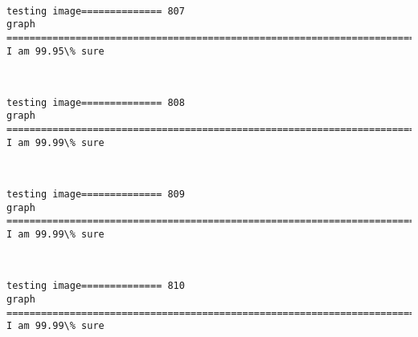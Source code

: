 \documentclass[11pt]{article}
\begin{document}
    \begin{center}
    \end{center}
    { \hspace*{\fill} \\}
    
    \begin{Verbatim}[commandchars=\\\{\}]
testing image============== 807
graph
============================================================================
I am 99.95\% sure

    \end{Verbatim}

    \begin{center}
    \end{center}
    { \hspace*{\fill} \\}
    
    \begin{Verbatim}[commandchars=\\\{\}]
testing image============== 808
graph
============================================================================
I am 99.99\% sure

    \end{Verbatim}

    \begin{center}
    \end{center}
    { \hspace*{\fill} \\}
    
    \begin{Verbatim}[commandchars=\\\{\}]
testing image============== 809
graph
============================================================================
I am 99.99\% sure

    \end{Verbatim}

    \begin{center}
    \end{center}
    { \hspace*{\fill} \\}
    
    \begin{Verbatim}[commandchars=\\\{\}]
testing image============== 810
graph
============================================================================
I am 99.99\% sure

    \end{Verbatim}
\end{document}
